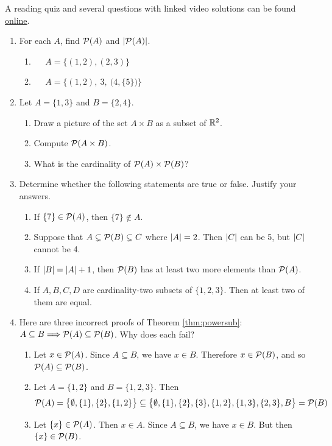 \begin{exercises}{}{}
	A reading quiz and several questions with linked video solutions can be found \href{http://www.math.uci.edu/~ndonalds/math13/selftest/6-2-power.html}{online}.


	\begin{enumerate}
	  \item For each $A$, find $\mathcal{P}(A)$ and $\left| \mathcal{P}(A)\right|$.
	  \begin{enumerate}
	    \item {} \  \ $A=\bigl\{(1,2),(2,3)\bigr\}$
	    \setcounter{enumii}{3}
	    \item {} \  \ $A=\Big\{(1,2),\ 3,\ \bigl(4,\{5\}\bigr)\Big\}$   
	  \end{enumerate}
	
		
		\item Let $A=\{1,3\}$ and $B=\{2,4\}$.
		\begin{enumerate}
		  \item Draw a picture of the set $A\times B$ as a subset of $\mathbb{R}^2$.
		  \item Compute $\mathcal{P}(A\times B)$.
		  \item What is the cardinality of $\mathcal{P}(A)\times\mathcal{P}(B)$? %
		\end{enumerate}
	  
	  
		\item Determine whether the following statements are true or false. Justify your answers.
	  \begin{enumerate}
	    \item If $\{7\}\in\mathcal{P}(A)$, then $\{7\}\notin A$.
	    \item Suppose that $A\subsetneq\mathcal{P}(B)\subsetneq C$ where $\left| A\right|=2$. Then $\left| C\right|$ can be 5, but $\left| C\right|$ cannot be 4.
	    \item If $\left| B\right|=\left| A\right|+1$, then $\mathcal{P}(B)$ has at least two more elements than $\mathcal{P}(A)$.
	    \item If $A,B,C,D$ are cardinality-two subsets of $\{1,2,3\}$. Then at least two of them are equal. 
	  \end{enumerate}
  
	
		\item\label{ex:powersub1} Here are three incorrect proofs of Theorem \ref{thm:powersub}: $A\subseteq B\Longrightarrow\mathcal{P}(A)\subseteq\mathcal{P}(B)$. Why does each fail?
		\begin{enumerate}
			\item Let $x\in\mathcal{P}(A)$. Since $A\subseteq B$, we have $x\in B$. Therefore $x\in\mathcal{P}(B)$, and so $\mathcal{P}(A)\subseteq\mathcal{P}(B)$.
			\item Let $A=\{1,2\}$ and $B=\{1,2,3\}$. Then
			\[
				\mathcal{P}(A)=\bigl\{\emptyset,\{1\},\{2\},\{1,2\}\bigr\} \subseteq \bigl\{\emptyset,\{1\},\{2\},\{3\},\{1,2\},\{1,3\},\{2,3\},B\bigr\}
				=\mathcal{P}(B)
			\]
			\item Let $\{x\}\in\mathcal{P}(A)$. Then $x\in A$. Since $A\subseteq B$, we have $x\in B$. But then $\{x\}\in\mathcal{P}(B)$.
		\end{enumerate}
	

\end{enumerate}
\end{exercises}
